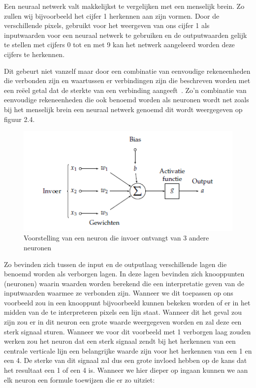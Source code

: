 Een neuraal netwerk valt makkelijkst te vergelijken met een menselijk brein. Zo zullen wij bijvoorbeeld het cijfer 1 herkennen aan zijn vormen. Door de verschillende pixels, gebruikt voor het weergeven van ons cijfer 1 als inputwaarden voor een neuraal netwerk te gebruiken en de outputwaarden gelijk te stellen met cijfers 0 tot en met 9 kan het netwerk aangeleerd worden deze cijfers te herkennen. 

Dit gebeurt niet vanzelf maar door een combinatie van eenvoudige rekeneenheden die verbonden zijn en waartussen er verbindingen zijn die beschreven worden met een re\"{e}el getal dat de sterkte van een verbinding aangeeft~\autocite{Lievens2018a}. Zo'n combinatie van eenvoudige rekeneenheden die ook benoemd worden als neuronen wordt net zoals bij het menselijk brein een neuraal netwerk genoemd dit wordt weergegeven op figuur 2.4. 

\begin{figure}
    \centering
    \caption{Voorstelling van een neuron die invoer ontvangt van 3 andere neuronen ~\autocite{Lievens2018a}}
    \label{fig:neuron}
    \includegraphics[width=0.7\linewidth]{neuron}
\end{figure}

Zo bevinden zich tussen de input en de outputlaag verschillende lagen die benoemd worden als verborgen lagen. In deze lagen bevinden zich knooppunten (neuronen) waarin waarden worden berekend die een interpretatie geven van de inputwaarden waarmee ze verbonden zijn. Wanneer we dit toepassen op ons voorbeeld zou in een knooppunt bijvoorbeeld kunnen bekeken worden of er in het midden van de te interpreteren pixels een lijn staat. Wanneer dit het geval zou zijn zou er in dit neuron een grote waarde weergegeven worden en zal deze een sterk signaal sturen. Wanneer we voor dit voorbeeld met 1 verborgen laag zouden werken zou het neuron dat een sterk signaal zendt bij het herkennen van een centrale verticale lijn een belangrijke waarde zijn voor het herkennen van een 1 en een 4. De sterke van dit signaal zal dus een grote invloed hebben op de kans dat het resultaat een 1 of een 4 is.
Wanneer we hier dieper op ingaan kunnen we aan elk neuron een formule toewijzen die er zo uitziet:

